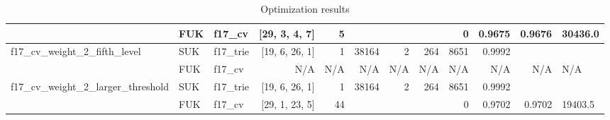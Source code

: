 \begin{table}[h]
{\begin{tabular}{lllrrrrrrrr}
 & FUK & f17\_cv & [29, 3, 4, 7] & 5 &  &  &  & 0 & 0.9675 & 0.9676 & 30436.0 \\
\hline
f17\_cv\_weight\_2\_fifth\_level & SUK & f17\_trie & [19, 6, 26, 1] & 1 & 38164 & 2 & 264 & 8651 & 0.9992 &  &  \\
 & FUK & f17\_cv & N/A & N/A & N/A & N/A & N/A & N/A & N/A & N/A & N/A \\
\hline
f17\_cv\_weight\_2\_larger\_threshold & SUK & f17\_trie & [19, 6, 26, 1] & 1 & 38164 & 2 & 264 & 8651 & 0.9992 &  &  \\
 & FUK & f17\_cv & [29, 1, 23, 5] & 44 &  &  &  & 0 & 0.9702 & 0.9702 & 19403.5 \\
\hline
\end{tabular}}
\caption{Optimization results}
\label{tab:opt_results}
\end{table}
